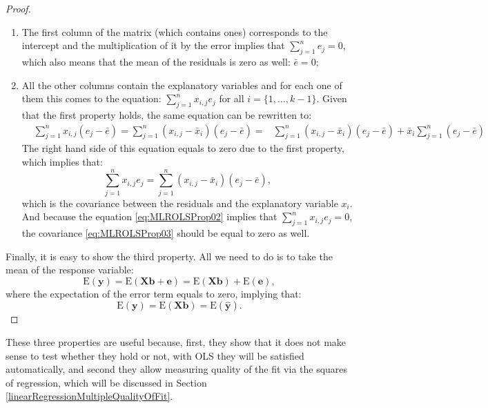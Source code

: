 \documentclass[
]{book}
\providecommand{\tightlist}{%
  \setlength{\itemsep}{0pt}\setlength{\parskip}{0pt}}
\theoremstyle{definition}
\theoremstyle{definition}
\theoremstyle{definition}
\theoremstyle{definition}
\theoremstyle{remark}
\begin{document}
\begin{proof}
\begin{enumerate}
\def\labelenumi{\arabic{enumi}.}
\tightlist
\item
  The first column of the matrix (which contains ones) corresponds to the intercept and the multiplication of it by the error implies that \(\sum_{j=1}^n e_j =0\), which also means that the mean of the residuals is zero as well: \(\bar{e}=0\);
\item
  All the other columns contain the explanatory variables and for each one of them this comes to the equation: \(\sum_{j=1}^n x_{i,j} e_j\) for all \(i=\{1, \dots, k-1\}\). Given that the first property holds, the same equation can be rewritten to:
  \begin{equation*}
   \begin{aligned}
   & \sum_{j=1}^n x_{i,j} (e_j - \bar{e}) = \sum_{j=1}^n (x_{i,j} - \bar{x}_i) (e_j - \bar{e}) =
   & \sum_{j=1}^n (x_{i,j} - \bar{x}_i) (e_j - \bar{e}) + \bar{x}_i \sum_{j=1}^n (e_j - \bar{e})
   \end{aligned}
  \end{equation*}
  The right hand side of this equation equals to zero due to the first property, which implies that:
  \begin{equation}
   \sum_{j=1}^n x_{i,j} e_j = \sum_{j=1}^n (x_{i,j} - \bar{x}_i) (e_j - \bar{e}),
   \label{eq:MLROLSProp03}
  \end{equation}
  which is the covariance between the residuals and the explanatory variable \(x_i\). And because the equation \eqref{eq:MLROLSProp02} implies that \(\sum_{j=1}^n x_{i,j} e_j=0\), the covariance \eqref{eq:MLROLSProp03} should be equal to zero as well.
\end{enumerate}

Finally, it is easy to show the third property. All we need to do is to take the mean of the response variable:
\begin{equation*}
    \mathrm{E}(\mathbf{y}) = \mathrm{E}(\mathbf{X} \boldsymbol{b} + \boldsymbol{e}) = \mathrm{E}(\mathbf{X} \boldsymbol{b}) + \mathrm{E}(\boldsymbol{e}) ,
\end{equation*}
where the expectation of the error term equals to zero, implying that:
\begin{equation*}
    \mathrm{E}(\mathbf{y}) = \mathrm{E}(\mathbf{X} \boldsymbol{b}) = \mathrm{E}(\hat{\mathbf{y}}) .
\end{equation*}
\end{proof}

These three properties are useful because, first, they show that it does not make sense to test whether they hold or not, with OLS they will be satisfied automatically, and second they allow measuring quality of the fit via the squares of regression, which will be discussed in Section \ref{linearRegressionMultipleQualityOfFit}.
\end{document}
